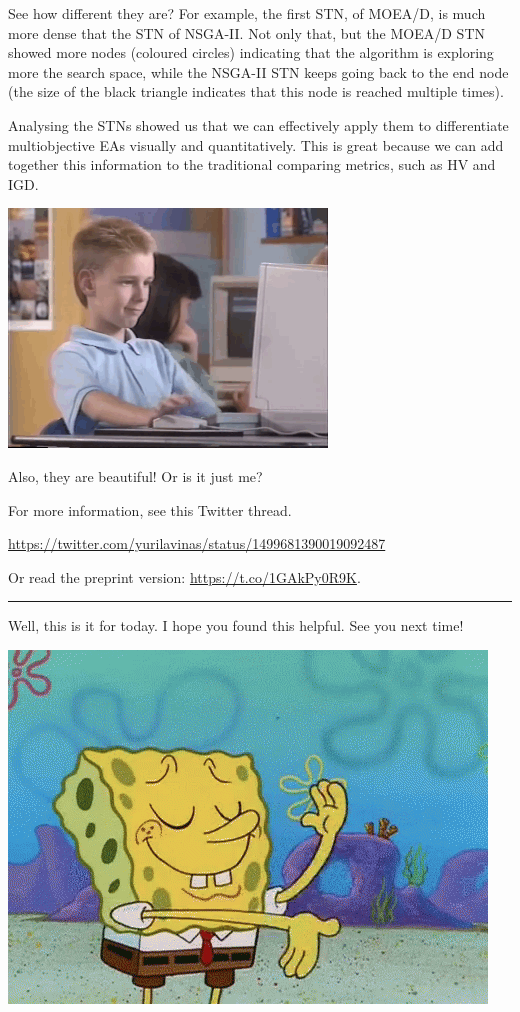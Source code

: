 \documentclass[
]{article}
\begin{document}
See how different they are? For example, the first STN, of MOEA/D, is
much more dense that the STN of NSGA-II. Not only that, but the MOEA/D
STN showed more nodes (coloured circles) indicating that the algorithm
is exploring more the search space, while the NSGA-II STN keeps going
back to the end node (the size of the black triangle indicates that this
node is reached multiple times).

Analysing the STNs showed us that we can effectively apply them to
differentiate multiobjective EAs visually and quantitatively. This is
great because we can add together this information to the traditional
comparing metrics, such as HV and IGD.

\begin{center}\includegraphics[width=0.5\linewidth]{gifs/good_job} \end{center}

Also, they are beautiful! Or is it just me?

For more information, see this Twitter thread.

\url{https://twitter.com/yurilavinas/status/1499681390019092487}

Or read the preprint version: \url{https://t.co/1GAkPy0R9K}.

\begin{center}\rule{0.5\linewidth}{0.5pt}\end{center}

Well, this is it for today. I hope you found this helpful. See you next
time!

\begin{center}\includegraphics{gifs/spongebob-done} \end{center}
\end{document}
